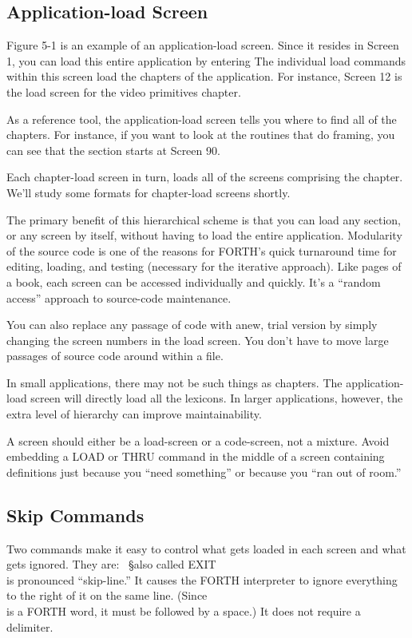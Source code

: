\subsection{Application-load Screen}

Figure 5-1 is an example of an application-load screen.  Since it resides in
Screen 1, you can load this entire application by entering
The individual load commands within this screen load the chapters of the
application.  For instance, Screen 12 is the load screen for the video
primitives chapter.

As a reference tool, the application-load screen tells you where to
find all of the chapters.  For instance, if you want to look at the routines
that do framing, you can see that the section starts at Screen 90.

Each chapter-load screen in turn, loads all of the screens comprising
the chapter.  We'll study some formats for chapter-load screens shortly.

The primary benefit of this hierarchical scheme is that you can load
any section, or any screen by itself, without having to load the entire application.
Modularity of the source code is one of the reasons for
FORTH's quick turnaround time for editing, loading, and testing
(necessary for the iterative approach).  Like pages of a book, each screen
can be accessed individually and quickly.  It's a ``random access'' approach
to source-code maintenance.

You can also replace any passage of code with anew, trial version by
simply changing the screen numbers in the load screen.  You don't have to
move large passages of source code around within a file.

In small applications, there may not be such things as chapters.  The
application-load screen will directly load all the lexicons.  In larger applications,
however, the extra level of hierarchy can improve maintainability.

A screen should either be a load-screen or a code-screen, not a mixture.
Avoid embedding a LOAD or THRU command in the middle of a
screen containing definitions just because you ``need something'' or
because you ``ran out of room.''

\subsection{Skip Commands}

Two commands make it easy to control what gets loaded in each screen
and what gets ignored.  They are:
\
\S also called EXIT
\\ is pronounced ``skip-line.'' It causes the FORTH interpreter to ignore
everything to the right of it on the same line.  (Since \\ is a FORTH word, it
must be followed by a space.) It does not require a delimiter.

